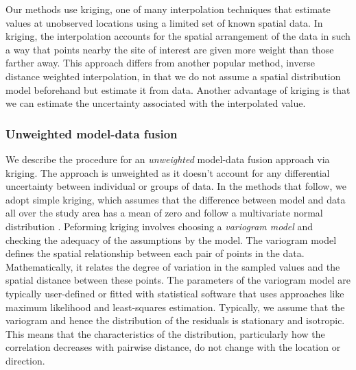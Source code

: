 Our methods use kriging, one of many interpolation techniques that estimate values at unobserved locations using a limited set of known spatial data. In kriging, the interpolation accounts for the spatial arrangement of the data in such a way that points nearby the site of interest are given more weight than those farther away. This approach differs from another popular method, inverse distance weighted interpolation, in that we do not assume a spatial distribution model beforehand but estimate it from data. Another advantage of kriging is that we can estimate the uncertainty associated with the interpolated value. 

\subsubsection{Unweighted model-data fusion} \label{subsection-kriging-interp}

We describe the procedure for an \textit{unweighted} model-data fusion approach via kriging. The approach is unweighted as it doesn't account for any differential uncertainty between individual or groups of data. In the methods that follow, we adopt simple kriging, which assumes that the difference between model and data all over the study area has a mean of zero and follow a multivariate normal distribution  \citep{Wackernagel2003}. Peforming kriging involves choosing a \textit{variogram model} and checking the adequacy of the assumptions by the model. The variogram model defines the spatial relationship between each pair of points in the data. Mathematically, it relates the degree of variation in the sampled values and the spatial distance between these points. The parameters of the variogram model are typically user-defined or fitted with statistical software that uses approaches like maximum likelihood and least-squares estimation. Typically, we assume that the variogram and hence the distribution of the residuals is stationary and isotropic. This means that the characteristics of the distribution, particularly how the correlation decreases with pairwise distance, do not change with the location or direction.


